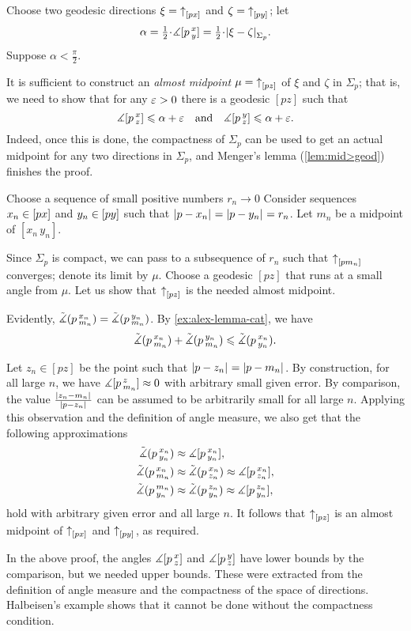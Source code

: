Choose two geodesic directions $\xi={\uparrow}_{[{p}{x}]_{{}}}$ and $\zeta={\uparrow}_{[{p}{y}]_{{}}}$;
let 
\[\alpha\z=\tfrac12\cdot \mangle \hinge pxy=\tfrac12\cdot \dist{\xi}{\zeta}{\Sigma_p}.\]
Suppose $\alpha<\tfrac\pi2$.

It is sufficient to construct an \emph{almost midpoint} $\mu={\uparrow}_{[{p}{z}]_{{}}}$ of $\xi$ and $\zeta$ in $\Sigma_p$;
that is, we need to show that for any $\varepsilon>0$ there is a geodesic $[pz]$ such that
\[\measuredangle[p\,{}^{x}_{z}]\leqslant \alpha+\varepsilon
\quad\text{and}\quad
\measuredangle[p\,{}^{y}_{z}]\leqslant \alpha+\varepsilon.\]
Indeed, once this is done, the compactness of $\Sigma_p$ can be used to get an actual midpoint for any two directions in $\Sigma_p$, and Menger's lemma (\ref{lem:mid>geod}) finishes the proof.

Choose a sequence of small positive numbers $r_n\to0$
Consider sequences $x_n\in [px]$ and $y_n\in [py]$ such that $|{p}-{x_n}|_{}^{{}}=|{p}-{y_n}|_{}^{{}}=r_n$.
Let $m_n$ be a midpoint of $[x_n\,y_n]$.

Since $\Sigma_p$ is compact, we can pass to a subsequence of $r_n$ such that
${\uparrow}_{[{p}{m_n}]_{{}}}$ converges;
denote its limit by $\mu$.
Choose a geodesic $[pz]$ that runs at a small angle from $\mu$.
Let us show that ${\uparrow}_{[{p}{z}]_{{}}}$ is the needed almost midpoint.

Evidently, $\tilde\measuredangle(p\,{}^{x_n}_{m_n})=\tilde\measuredangle(p\,{}^{y_n}_{m_n})$.
By \ref{ex:alex-lemma-cat}, we have
\[\tilde\measuredangle(p\,{}^{x_n}_{m_n})+\tilde\measuredangle(p\,{}^{y_n}_{m_n})\leqslant \tilde\measuredangle(p\,{}^{x_n}_{y_n}).\]

Let $z_n\in [pz]$ be the point such that $|{p}-{z_n}|_{}^{{}}=|{p}-{m_n}|_{}^{{}}$.
By construction, for all large $n$, we have $\measuredangle[p\,{}^{z}_{m_n}]\approx0$  with arbitrary small given error.
By comparison, the value $\frac{|{z_n}-{m_n}|_{}^{{}}}{|{p}-{z_n}|_{}^{{}}}$ can be assumed to be arbitrarily small for all large $n$.
Applying this observation and the definition of angle measure, we also get that the following approximations
\begin{align*}
\tilde\measuredangle(p\,{}^{x_n}_{y_n})&\approx \measuredangle[p\,{}^{x_n}_{y_n}],
\\
\tilde\measuredangle(p\,{}^{x_n}_{m_n})&\approx\tilde\measuredangle(p\,{}^{x_n}_{z_n})\approx\measuredangle[p\,{}^{x_n}_{z_n}],
\\
\tilde\measuredangle(p\,{}^{m_n}_{y_n})&\approx\tilde\measuredangle(p\,{}^{z_n}_{y_n})\approx\measuredangle[p\,{}^{z_n}_{y_n}],
\end{align*}
hold with arbitrary given error and all large $n$.
It follows that ${\uparrow}_{[{p}{z}]_{{}}}$ is an almost midpoint of ${\uparrow}_{[{p}{x}]_{{}}}$ and ${\uparrow}_{[{p}{y}]_{{}}}$, as required.
\qeds

In the above proof, the angles $\measuredangle[p\,{}^{x}_{z}]$ and $\measuredangle[p\,{}^{y}_{z}]$ have lower bounds by
the comparison, but we needed upper bounds.
These were extracted from the definition of angle measure and the compactness of the space of directions.
Halbeisen's example \cite{alexander-kapovitch-petrunin2024} shows that it cannot be done without the compactness condition.

